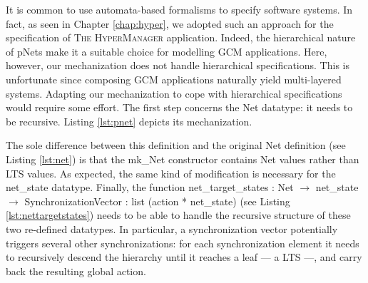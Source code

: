 	
	It is common to use automata-based formalisms to specify software systems. In fact,		
	as seen in Chapter \ref{chap:hyper}, we adopted such an approach for the specification
	of \textsc{The HyperManager} application. Indeed, the hierarchical nature of pNets
	make it a suitable choice for modelling \ac{GCM} applications. Here, however,
	our mechanization does not handle hierarchical specifications. This is unfortunate
	since composing \ac{GCM} applications naturally yield multi-layered systems.
	Adapting our mechanization to cope with hierarchical specifications would
	require some effort. The first step concerns the \textsf{Net} datatype: it
	needs to be recursive. Listing \ref{lst:pnet} depicts its mechanization.
	
		
						

	\noindent The sole difference between this definition and the original \textsf{Net}
	definition (see Listing \ref{lst:net}) is that the \textsf{mk\_Net} constructor
	contains \textsf{Net} values rather than \textsf{LTS} values. As expected, the same kind
	of modification is necessary for the \textsf{net\_state} datatype. Finally,
	the function 
	\textsf{net\_target\_states : Net $\rightarrow$ net\_state $\rightarrow$ SynchronizationVector : 
	list (action * net\_state)} (see Listing \ref{lst:nettargetstates}) 
	needs to be able to handle the recursive structure of these two
	re-defined datatypes. In particular, a synchronization vector potentially triggers 
	several other synchronizations: for each synchronization element it needs to recursively
	descend the hierarchy until it reaches a leaf --- a \textsf{LTS} ---, and carry back the 
	resulting global \textsf{action}. 
	
